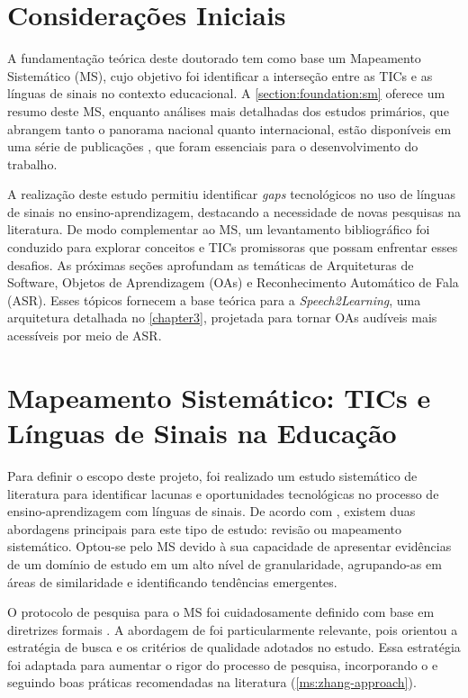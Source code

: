 \section{Considerações Iniciais}

A fundamentação teórica deste doutorado tem como base um Mapeamento Sistemático (MS), cujo objetivo foi identificar a interseção entre as TICs e as línguas de sinais no contexto educacional. A \autoref{section:foundation:sm} oferece um resumo deste MS, enquanto análises mais detalhadas dos estudos primários, que abrangem tanto o panorama nacional quanto internacional, estão disponíveis em uma série de publicações \cite{FalvoJr2020_FIE, FalvoJr2020_SBIE, FalvoJr2021_RENOTE}, que foram essenciais para o desenvolvimento do trabalho.

A realização deste estudo permitiu identificar \textit{gaps} tecnológicos no uso de línguas de sinais no ensino-aprendizagem, destacando a necessidade de novas pesquisas na literatura. De modo complementar ao MS, um levantamento bibliográfico foi conduzido para explorar conceitos e TICs promissoras que possam enfrentar esses desafios. As próximas seções aprofundam as temáticas de Arquiteturas de Software, Objetos de Aprendizagem (OAs) e Reconhecimento Automático de Fala (ASR). Esses tópicos fornecem a base teórica para a \textit{Speech2Learning}, uma arquitetura detalhada no \autoref{chapter3}, projetada para tornar OAs audíveis mais acessíveis por meio de ASR.

\section{Mapeamento Sistemático: TICs e Línguas de Sinais na Educação}
\label{section:foundation:sm}

Para definir o escopo deste projeto, foi realizado um estudo sistemático de literatura para identificar lacunas e oportunidades tecnológicas no processo de ensino-aprendizagem com línguas de sinais. De acordo com , existem duas abordagens principais para este tipo de estudo: revisão ou mapeamento sistemático. Optou-se pelo MS devido à sua capacidade de apresentar evidências de um domínio de estudo em um alto nível de granularidade, agrupando-as em áreas de similaridade e identificando tendências emergentes.

O protocolo de pesquisa para o MS foi cuidadosamente definido com base em diretrizes formais  \cite{Kitchenham2007, Nakagawa2010, Zhang2011, Petersen2015}. A abordagem de  foi particularmente relevante, pois orientou a estratégia de busca e os critérios de qualidade adotados no estudo. Essa estratégia foi adaptada para aumentar o rigor do processo de pesquisa, incorporando o  e seguindo boas práticas recomendadas na literatura (\autoref{ms:zhang-approach}).

